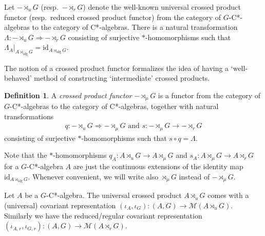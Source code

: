 \documentclass[12pt]{amsart}
\theoremstyle{definition}
\newtheorem{defn}[thm]{Definition}
\theoremstyle{remark}
\numberwithin{equation}{section}
\begin{document}
Let $-\rtimes_{u} G$  (resp.\ $-\rtimes_{r} G$) denote  the well-known
universal crossed product functor (resp.\ reduced crossed product functor) from the category of $G$-C*-algebras to the category of C*-algebras.
There is a natural transformation $\Lambda\colon -\rtimes_{u}G \Rightarrow -\rtimes_{r}G$
consisting of surjective $*$-homomorphisms such that
$\Lambda_A\vert_{A\rtimes_{\mathrm{alg}}G} = \mathrm{id}_{A\rtimes_{\mathrm{alg}}G}$.

The notion of a crossed product functor formalizes the idea of having  a `well-behaved' method of constructing `intermediate' crossed products.

\begin{defn}
	A \emph{crossed product functor} $-\rtimes_\mu G$ is a functor
from the category of $G$-C*-algebras to the category of C*-algebras, together with natural transformations
	\begin{align*}
		q\colon -\rtimes_u G \Rightarrow -\rtimes_\mu G \mbox{ and } s\colon	 -\rtimes_\mu G
		\rightarrow -\rtimes_r G
	\end{align*}
	consisting of surjective $*$-homomorphisms such that $s\circ 	q = \Lambda$.
\end{defn}
Note that the $*$-homomorphisms $q_A\colon A\rtimes_u G\to A\rtimes_\mu G$ and $s_A\colon
	A\rtimes_\mu G \to A\rtimes_r G$ for a $G$-C*-algebra $A$ are just the continuous
	extensions of the identity map $\mathrm{id}_{A\rtimes_{\mathrm{alg}} G}$. %
Whenever convenient, we will write also $\rtimes_\mu G$ instead of $-\rtimes_\mu G$.



Let $A$ be a $G$-C*-algebra. The universal crossed product $A\rtimes_u G$ comes with
a (universal) covariant representation $(\iota_A,\iota_G)\colon (A,G) \to \mathcal{M}(A\rtimes_u G)$.
Similarly we have the reduced/regular covariant representation $(\iota_{A,r},\iota_{G,r})\colon (A,G) \to \mathcal{M}(A\rtimes_r G)$.
\end{document}
